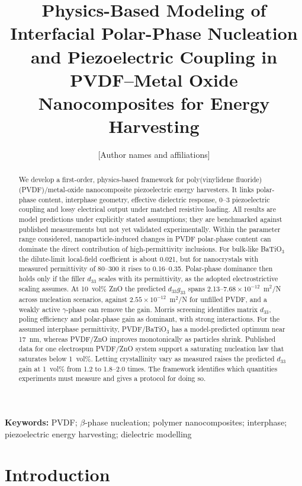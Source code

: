 \documentclass[11pt,a4paper]{article}
\title{Physics-Based Modeling of Interfacial Polar-Phase Nucleation and Piezoelectric Coupling in PVDF--Metal Oxide Nanocomposites for Energy Harvesting}
\author{[Author names and affiliations]}
\date{}
\newcommand{\BTO}{BaTiO$_3$}
\newcommand{\dt}{d_{33}}
\begin{document}
\maketitle

\begin{abstract}
We develop a first-order, physics-based framework for poly(vinylidene fluoride) (PVDF)/\allowbreak metal-oxide nanocomposite piezoelectric energy harvesters. It links polar-phase content, interphase geometry, effective dielectric response, 0--3 piezoelectric coupling and lossy electrical output under matched resistive loading. All results are model predictions under explicitly stated assumptions; they are benchmarked against published measurements but not yet validated experimentally. Within the parameter range considered, nanoparticle-induced changes in PVDF polar-phase content can dominate the direct contribution of high-permittivity inclusions. For bulk-like \BTO{} the dilute-limit local-field coefficient is about 0.021, but for nanocrystals with measured permittivity of 80--300 it rises to 0.16--0.35. Polar-phase dominance then holds only if the filler $\dt$ scales with its permittivity, as the adopted electrostrictive scaling assumes. At 10~vol\% ZnO the predicted $\dt g_{33}$ spans 2.13--$7.68\times10^{-12}$~m$^2$/N across nucleation scenarios, against $2.55\times10^{-12}$~m$^2$/N for unfilled PVDF, and a weakly active $\gamma$-phase can remove the gain. Morris screening identifies matrix $\dt$, poling efficiency and polar-phase gain as dominant, with strong interactions. For the assumed interphase permittivity, PVDF/\BTO{} has a model-predicted optimum near 17~nm, whereas PVDF/ZnO improves monotonically as particles shrink. Published data for one electrospun PVDF/ZnO system support a saturating nucleation law that saturates below 1~vol\%. Letting crystallinity vary as measured raises the predicted $\dt$ gain at 1~vol\% from 1.2 to 1.8--2.0 times. The framework identifies which quantities experiments must measure and gives a protocol for doing so.
\end{abstract}

\noindent\textbf{Keywords:} PVDF; $\beta$-phase nucleation; polymer nanocomposites; interphase; piezoelectric energy harvesting; dielectric modelling

\section{Introduction}
\end{document}
